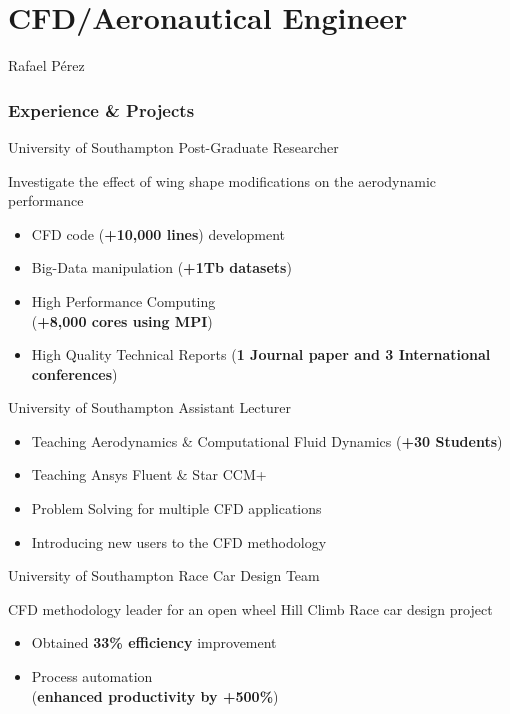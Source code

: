 \documentclass[fontsize=10pt]{tccv}
\begin{document}
\part{CFD/Aeronautical Engineer}{Rafael P\'erez}

\section{Experience \& Projects}
\begin{eventlist}
     {University of Southampton}
     {Post-Graduate Researcher}

Investigate the effect of wing shape modifications on
the aerodynamic performance
\begin{itemize}
	\itemsep -1pt
	\item CFD code (\textbf{+10,000 lines}) development
	\item Big-Data manipulation (\textbf{+1Tb datasets})
	\item High Performance Computing\\ (\textbf{+8,000 cores using MPI})
	\item High Quality Technical Reports (\textbf{1 Journal paper and 3 International
	conferences})
\end{itemize}

	{University of Southampton}
	{Assistant Lecturer}
\begin{itemize}
	\itemsep -1pt
	\item Teaching Aerodynamics \& Computational Fluid Dynamics (\textbf{+30 Students})
	\item Teaching Ansys Fluent \& Star CCM+
	\item Problem Solving for multiple CFD applications
	\item Introducing new users to the CFD methodology
\end{itemize}

     {University of Southampton}
     {Race Car Design Team}

CFD methodology leader for an open wheel Hill Climb Race car design project
     \begin{itemize}
	\itemsep -1pt
     	\item Obtained \textbf{33\% efficiency} improvement
     	\item Process automation \\(\textbf{enhanced productivity by +500\%})
     \end{itemize}


\end{eventlist}
\end{document}
